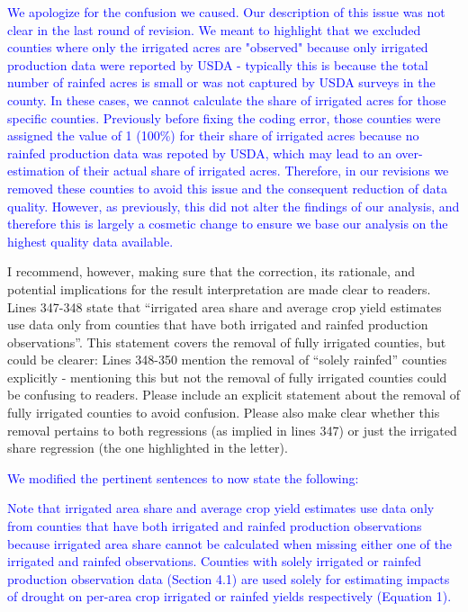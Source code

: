 \documentclass[
]{article}
\begin{document}
\textcolor{blue}{We apologize for the confusion we caused. Our description of this issue was not clear in the last round of revision. We meant to highlight that we excluded counties where only the irrigated acres are "observed" because only irrigated production data were reported by USDA - typically this is because the total number of rainfed acres is small or was not captured by USDA surveys in the county. In these cases, we cannot  calculate the share of irrigated acres for those specific counties. Previously before fixing the coding error, those counties were assigned the value of 1 (100\%) for their share of irrigated acres because no rainfed production data was repoted by USDA, which may lead to an over-estimation of their actual share of irrigated acres. Therefore, in our revisions we removed these counties to avoid this issue and the consequent reduction of data quality. However, as previously, this did not alter the findings of our analysis, and therefore this is largely a cosmetic change to ensure we base our analysis on the highest quality data available.}

I recommend, however, making sure that the correction, its rationale,
and potential implications for the result interpretation are made clear
to readers. Lines 347-348 state that ``irrigated area share and average
crop yield estimates use data only from counties that have both
irrigated and rainfed production observations''. This statement covers
the removal of fully irrigated counties, but could be clearer: Lines
348-350 mention the removal of ``solely rainfed'' counties explicitly -
mentioning this but not the removal of fully irrigated counties could be
confusing to readers. Please include an explicit statement about the
removal of fully irrigated counties to avoid confusion. Please also make
clear whether this removal pertains to both regressions (as implied in
lines 347) or just the irrigated share regression (the one highlighted
in the letter).

\textcolor{blue}{We modified the pertinent sentences to now state the following:}

\textcolor{blue}{Note that irrigated area share and average crop yield estimates use data only from counties that have both irrigated and rainfed production observations because irrigated area share cannot be calculated when missing either one of the irrigated and rainfed observations. Counties with solely irrigated or rainfed production observation data (Section 4.1) are used solely for estimating impacts of drought on per-area crop irrigated or rainfed yields respectively (Equation 1).}
\end{document}
